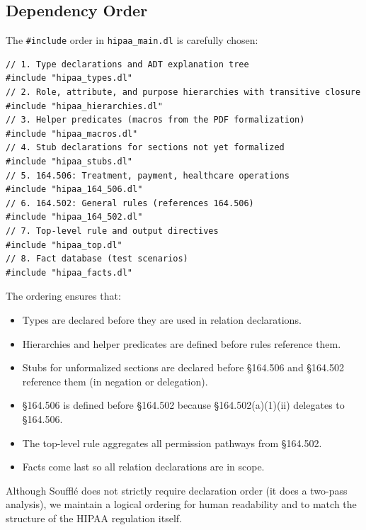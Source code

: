 \documentclass[11pt,letterpaper]{article}
\begin{document}
\subsection{Dependency Order}

The \texttt{\#include} order in \texttt{hipaa\_main.dl} is carefully chosen:

\begin{lstlisting}[style=soufflestyle,caption={hipaa\_main.dl --- include order}]
// 1. Type declarations and ADT explanation tree
#include "hipaa_types.dl"
// 2. Role, attribute, and purpose hierarchies with transitive closure
#include "hipaa_hierarchies.dl"
// 3. Helper predicates (macros from the PDF formalization)
#include "hipaa_macros.dl"
// 4. Stub declarations for sections not yet formalized
#include "hipaa_stubs.dl"
// 5. 164.506: Treatment, payment, healthcare operations
#include "hipaa_164_506.dl"
// 6. 164.502: General rules (references 164.506)
#include "hipaa_164_502.dl"
// 7. Top-level rule and output directives
#include "hipaa_top.dl"
// 8. Fact database (test scenarios)
#include "hipaa_facts.dl"
\end{lstlisting}

The ordering ensures that:
\begin{itemize}
  \item Types are declared before they are used in relation declarations.
  \item Hierarchies and helper predicates are defined before rules reference them.
  \item Stubs for unformalized sections are declared before \S 164.506 and \S 164.502 reference them (in negation or delegation).
  \item \S 164.506 is defined before \S 164.502 because \S 164.502(a)(1)(ii) delegates to \S 164.506.
  \item The top-level rule aggregates all permission pathways from \S 164.502.
  \item Facts come last so all relation declarations are in scope.
\end{itemize}

\begin{designbox}
Although Souffl\'{e} does not strictly require declaration order (it does a two-pass analysis), we maintain a logical ordering for human readability and to match the structure of the HIPAA regulation itself.
\end{designbox}


\end{document}

